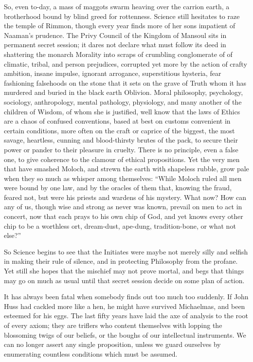 So, even to-day, a mass of maggots swarm heaving over the carrion earth, a brotherhood bound by blind greed for rottenness. Science still hesitates to raze the temple of Rimmon, though every year finds more of her sons impatient of Naaman's prudence. The Privy Council of the Kingdom of Mansoul sits in permanent secret session; it dares not declare what must follow its deed in shattering the monarch Morality into scraps of crumbling conglomerate of of climatic, tribal, and person prejudices, corrupted yet more by the action of crafty ambition, insane impulse, ignorant arrogance, superstitious hysteria, fear fashioning falsehoods on the stone that it sets on the grave of Truth whom it has murdered and buried in the black earth Oblivion. Moral philosophy, psychology, sociology, anthropology, mental pathology, physiology, and many another of the children of Wisdom, of whom she is justified, well know that the laws of Ethics are a chaos of confused conventions, based at best on customs convenient in certain conditions, more often on the craft or caprice of the biggest, the most savage, heartless, cunning and blood-thirsty brutes of the pack, to secure their power or pander to their pleasure in cruelty. There is no principle, even a false one, to give coherence to the clamour of ethical propositions. Yet the very men that have smashed Moloch, and strewn the earth with shapeless rubble, grow pale when they so much as whisper among themselves: \enquote{While Moloch ruled all men were bound by one law, and by the oracles of them that, knowing the fraud, feared not, but were his priests and wardens of his mystery. What now? How can any of us, though wise and strong as never was known, prevail on men to act in concert, now that each prays to his own chip of God, and yet knows every other chip to be a worthless ort, dream-dust, ape-dung, tradition-bone, or \textemdash{} what not else?}

So Science begins to see that the Initiates were maybe not merely silly and selfish in making their rule of silence, and in protecting Philosophy from the profane. Yet still she hopes that the mischief may not prove mortal, and begs that things may go on much as usual until that secret session decide on some plan of action.

It has always been fatal when somebody finds out too much too suddenly. If John Huss had cackled more like a hen, he might have survived Michaelmas, and been esteemed for his eggs. The last fifty years have laid the axe of analysis to the root of every axiom; they are triflers who content themselves with lopping the blossoming twigs of our beliefs, or the boughs of our intellectual instruments. We can no longer assert any single proposition, unless we guard ourselves by enumerating countless conditions which must be assumed.

